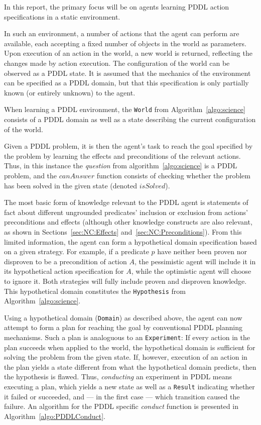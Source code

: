 \documentclass[../Master.tex]{subfiles}
\begin{document}
In this report, the primary focus will be on agents learning PDDL action specifications in a static environment.

In such an environment, a number of actions that the agent can perform are available, each accepting a fixed number of objects in the world as parameters. Upon execution of an action in the world, a new world is returned, reflecting the changes made by action execution. The configuration of the world can be observed as a PDDL state. It is assumed that the mechanics of the environment can be specified as a PDDL domain, but that this specification is only partially known (or entirely unknown) to the agent. 

When learning a PDDL environment, the \texttt{World} from Algorithm~\ref{algo:science} consists of a PDDL domain as well as a state describing the current configuration of the world.

Given a PDDL problem, it is then the agent's task to reach the goal specified by the problem by learning the effects and preconditions of the relevant actions. Thus, in this instance the \textit{question} from algorithm~\ref{algo:science} is a PDDL problem, and the $canAnswer$ function consists of checking whether the problem has been solved in the given state (denoted $isSolved$).

The most basic form of knowledge relevant to the PDDL agent is statements of fact about different ungrounded predicates' inclusion or exclusion from actions' preconditions and effects (although other knowledge constructs are also relevant, as shown in Sections~\ref{sec:NC:Effects} and~\ref{sec:NC:Preconditions}). From this limited information, the agent can form a hypothetical domain specification based on a given strategy. For example, if a predicate $p$ have neither been proven nor disproven to be a precondition of action $A$, the pessimistic agent will include it in its hypothetical action specification for $A$, while the optimistic agent will choose to ignore it. Both strategies will fully include proven and disproven knowledge. This hypothetical domain constitutes the \texttt{Hypothesis} from Algorithm~\ref{algo:science}.

Using a hypothetical domain (\texttt{Domain}) as described above, the agent can now attempt to form a plan for reaching the goal by conventional PDDL planning mechanisms. Such a plan is analoguous to an \texttt{Experiment}: If every action in the plan succeeds when applied to the world, the hypothetical domain is sufficient for solving the problem from the given state. If, however, execution of an action in the plan yields a state different from what the hypothetical domain predicts, then the hypothesis is flawed. Thus, \emph{conducting} an experiment in PDDL means executing a plan, which yields a new state as well as a \texttt{Result} indicating whether it failed or succeeded, and --- in the first case --- which transition caused the failure. An algorithm for the PDDL specific \textit{conduct} function is presented in Algorithm~\ref{algo:PDDLConduct}. 
\end{document}
